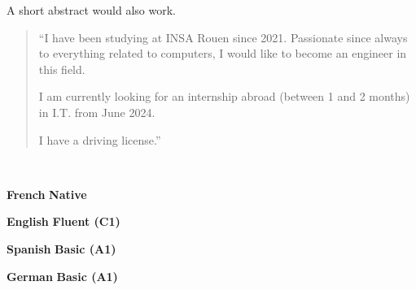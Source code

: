 \documentclass[10pt,a4paper,ragged2e,withhyper]{./AltaCV/altacv}
\begin{document}
\begin{paracol}{2}
  \divider

  A short abstract would also work.

  \medskip

  \switchcolumn


  \begin{quote}
    ``I have been studying at INSA Rouen since
    2021. Passionate since always
    to everything related to computers, I
    would like to become an engineer in this
    field.
    
    I am currently looking for an internship abroad (between 1 and 2 months) in I.T. from June 2024.
    
    I have a driving license.''
  \end{quote}



  \divider

  
  \divider
  


  \\

  \divider

  \cvtag{\LaTeX}


  \textcolor{emphasis}{\textbf{French}} \hfill \textbf{Native}\\

  \divider

  \textcolor{emphasis}{\textbf{English}} \hfill \textbf{Fluent (C1)}\\
  
  \divider

  \textcolor{emphasis}{\textbf{Spanish}} \hfill \textbf{Basic (A1)}\\

  \divider

  \textcolor{emphasis}{\textbf{German}} \hfill \textbf{Basic (A1)}\\

\end{paracol}
\end{document}
